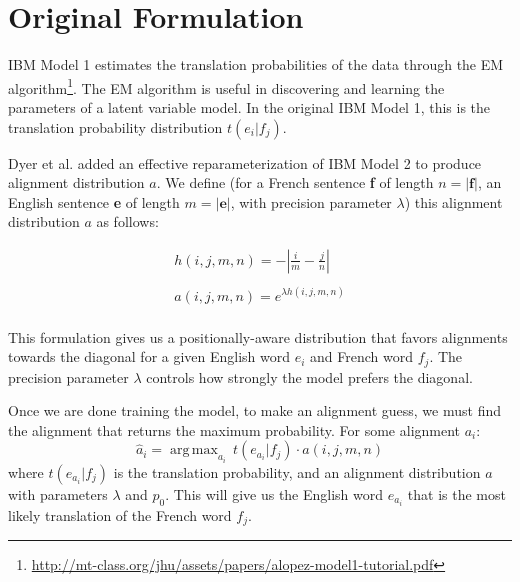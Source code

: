 \documentclass[twoside,twocolumn]{article}
\DeclareMathOperator*{\argmax}{arg\,max}
\begin{document}




\section{Original Formulation}


IBM Model 1 estimates the translation probabilities of the data through the EM
algorithm\footnote{\url{http://mt-class.org/jhu/assets/papers/alopez-model1-tutorial.pdf}}.
The EM algorithm is useful in discovering and learning the parameters of a
latent variable model. In the original IBM Model 1, this is the translation
probability distribution $t(e_i|f_j)$.

Dyer et al. \cite{dyer2013simple} added an effective reparameterization
of IBM Model 2 to produce alignment distribution $a$. We define (for a French
sentence \textbf{f} of length $n = |\textbf{f}|$, an English sentence \textbf{e}
of length $m=|\textbf{e}|$, with precision parameter $\lambda$) this alignment
distribution $a$ as follows:

\begin{equation}
\begin{split}
h(i,j,m,n) = - \left| \frac{i}{m} - \frac{j}{n}\right| \\
\\
a(i,j,m,n) =e^{  \lambda h(i,j,m,n)} \\
\end{split}
\end{equation}

This formulation gives us a positionally-aware distribution that favors alignments
towards the diagonal for a given English word $e_i$ and French word $f_j$. The
precision parameter $\lambda$ controls how strongly the model prefers the
diagonal.

Once we are done training the model, to make an alignment guess, we must find
the alignment that returns the maximum probability. For some alignment $a_i$:
\begin{equation}
\hat{a}_i = \argmax_{a_i} \, t(e_{a_i}|f_j) \cdot a(i, j, m, n)
\end{equation}
where $t(e_{a_i}|f_j)$ is the translation probability, and an alignment
distribution $a$ with parameters $\lambda$ and $p_0$. This will give us the
English word $e_{a_i}$ that is the most likely translation of the French word
$f_j$.
\end{document}
